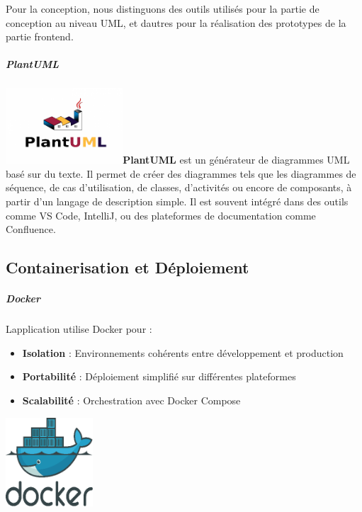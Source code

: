 \documentclass[12pt,a4paper,twoside]{report}
\begin{document}
Pour la conception, nous distinguons des outils utilisés pour la partie
de conception au niveau UML, et d\textquotesingle autres pour la
réalisation des prototypes de la partie frontend.

\hypertarget{plantuml}{%
\subparagraph{PlantUML~}\label{plantuml}}

\includegraphics[width=1.72222in,height=1.11389in]{latex_media/media/image37.png}\textbf{PlantUML}
est un générateur de diagrammes UML basé sur du texte. Il permet de
créer des diagrammes tels que les diagrammes de séquence, de cas
d'utilisation, de classes, d'activités ou encore de composants, à partir
d'un langage de description simple. Il est souvent intégré dans des
outils comme VS Code, IntelliJ, ou des plateformes de documentation
comme Confluence.

\hypertarget{containerisation-et-duxe9ploiement}{%
\subsection{Containerisation et
Déploiement}\label{containerisation-et-duxe9ploiement}}

\hypertarget{docker}{%
\subparagraph{Docker}\label{docker}}

L\textquotesingle application utilise Docker pour :

\begin{itemize}
\item
  \textbf{Isolation} : Environnements cohérents entre développement et
  production
\item
  \textbf{Portabilité} : Déploiement simplifié sur différentes
  plateformes
\item
  \textbf{Scalabilité} : Orchestration avec Docker Compose
\end{itemize}

\includegraphics[width=1.28125in,height=1.31126in]{latex_media/media/image38.png}
\end{document}
